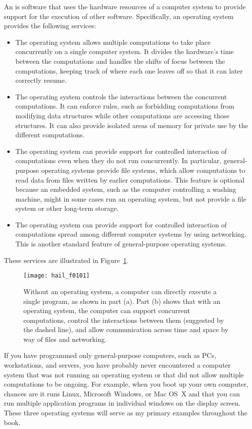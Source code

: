 An  is software that uses the hardware
resources of a computer system to provide support for the execution of
other software.  Specifically, an operating system provides the
following services:
\begin{itemize}
\item
The operating system allows multiple computations to take place
concurrently on a single computer system.  It divides the hardware's
time between the computations and handles the shifts of focus between
the computations, keeping track of where each one leaves off so that
it can later correctly resume.
\item
The operating system controls the interactions between the concurrent
computations.  It can enforce rules, such as forbidding computations
from modifying data structures while other computations are accessing
those structures.  It can also provide isolated areas of memory for
private use by the different computations.
\item
The operating system can provide support for controlled
interaction of computations even when they do not run concurrently.
In particular, general-purpose operating systems provide file systems,
which allow computations to read data from files written by earlier
computations.  This feature is optional because an embedded system,
such as the computer controlling a washing machine, might in some
cases run an operating system, but not provide a file system or other
long-term storage.
\item
The operating system can provide support for
controlled interaction of computations spread among different computer
systems by using networking. This is another standard feature of
general-purpose operating systems.
\end{itemize}
These services are illustrated in Figure~\ref{scan-1-1}.
\begin{figure}
\centerline{\texttt{[image: hail\_f0101]}}
\caption{Without an operating system, a computer can directly execute
  a single program, as shown in part (a).  Part (b) shows that with an operating system,
  the computer can support concurrent computations, control the
  interactions between them (suggested by the dashed line), and allow
  communication across time and space by way of files and networking.}
\label{scan-1-1}
\end{figure}

If you have programmed only general-purpose computers, such as PCs,
workstations, and servers, you have probably never encountered a
computer system that was not running an operating system or that did
not allow multiple computations to be ongoing.  For example, when you
boot up your own computer, chances are it runs Linux, Microsoft
Windows, or Mac OS~X and that you can run multiple application
programs in individual windows on the display screen.  These three
operating systems will serve as my primary examples throughout the
book.

